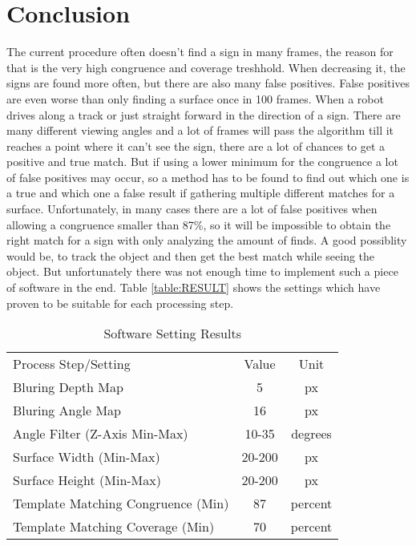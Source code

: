 \chapter{Conclusion}
\graphicspath{{./Conclusion/img/}}

The current procedure often doesn't find a sign in many frames, the reason for that is the very high congruence and coverage
treshhold. When decreasing it, the signs are found more often, but there are also many false positives. False positives are
even worse than only finding a surface once in 100 frames. When a robot drives along a track or just 
straight forward in the direction of a sign. There are many different viewing angles and a lot of frames will pass the algorithm
till it reaches a point where it can't see the sign, there are a lot of chances to get a positive and true match. But if
using a lower minimum for the congruence a lot of false positives may occur, so a method has to be found to find out
which one is a true and which one a false result if gathering multiple different matches for a surface.
Unfortunately, in many cases there are a lot of false positives when allowing a congruence smaller than 87\%, so 
it will be impossible to obtain the right match for a sign with only analyzing the amount of finds.
A good possiblity would be, to track the object and then get the best match while seeing the object.
But unfortunately there was not enough time to implement such a piece of software in the end. 
Table \vref{table:RESULT} shows the settings which have proven to be suitable for each processing step.

\begin{table}[H]
	\centering
	\begin{tabular}{lcc}
		Process Step/Setting 							   & Value                 & Unit \\
		Bluring Depth Map								   & 5\footnotemark[1]     & px   \\
		Bluring Angle Map								   & 16\footnotemark[1]    & px   \\
		Angle Filter (Z-Axis Min-Max)                      & 10-35                 & degrees \\
		Surface Width (Min-Max)                            & 20-200                & px \\
		Surface Height (Min-Max)                           & 20-200                & px \\
		Template Matching Congruence (Min)                 & 87                    & percent \\
		Template Matching Coverage (Min)                   & 70                    & percent \\
	\end{tabular}
\caption{Software Setting Results}
\label{table:RESULT}
\end{table}


